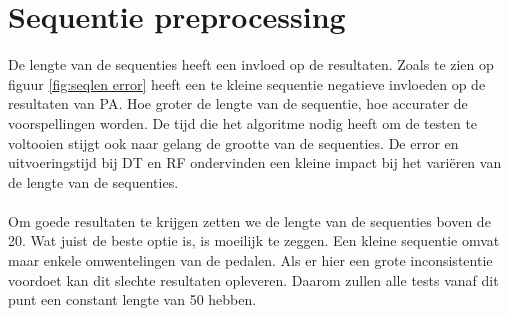 \section{Sequentie preprocessing}
De lengte van de sequenties heeft een invloed op de resultaten. Zoals te zien op figuur \ref{fig:seqlen error} heeft een te kleine sequentie negatieve invloeden op de resultaten van PA. Hoe groter de lengte van de sequentie, hoe accurater de voorspellingen worden. De tijd die het algoritme nodig heeft om de testen te voltooien stijgt ook naar gelang de grootte van de sequenties. De error en uitvoeringstijd bij DT en RF ondervinden een kleine impact bij het variëren van de lengte van de sequenties. 
\\\\
Om goede resultaten te krijgen zetten we de lengte van de sequenties boven de 20. Wat juist de beste optie is, is moeilijk te zeggen. Een kleine sequentie omvat maar enkele omwentelingen van de pedalen. Als er hier een grote inconsistentie voordoet kan dit slechte resultaten opleveren. Daarom zullen alle tests vanaf dit punt een constant lengte van 50 hebben. 
